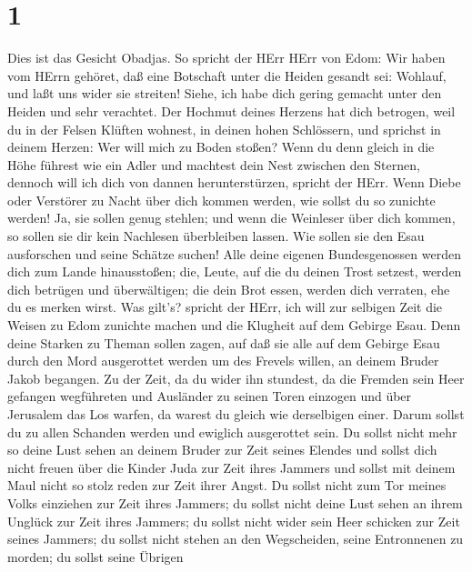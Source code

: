 \hypertarget{section}{%
\section{1}\label{section}}

 Dies ist das Gesicht Obadjas. So spricht der HErr HErr von
Edom: Wir haben vom HErrn gehöret, daß eine Botschaft unter die Heiden
gesandt sei: Wohlauf, und laßt uns wider sie streiten! 
Siehe, ich habe dich gering gemacht unter den Heiden und sehr verachtet.
 Der Hochmut deines Herzens hat dich betrogen, weil du in
der Felsen Klüften wohnest, in deinen hohen Schlössern, und sprichst in
deinem Herzen: Wer will mich zu Boden stoßen?  Wenn du denn
gleich in die Höhe führest wie ein Adler und machtest dein Nest zwischen
den Sternen, dennoch will ich dich von dannen herunterstürzen, spricht
der HErr.  Wenn Diebe oder Verstörer zu Nacht über dich
kommen werden, wie sollst du so zunichte werden! Ja, sie sollen genug
stehlen; und wenn die Weinleser über dich kommen, so sollen sie dir kein
Nachlesen überbleiben lassen.  Wie sollen sie den Esau
ausforschen und seine Schätze suchen!  Alle deine eigenen
Bundesgenossen werden dich zum Lande hinausstoßen; die, Leute, auf die
du deinen Trost setzest, werden dich betrügen und überwältigen; die dein
Brot essen, werden dich verraten, ehe du es merken wirst. 
Was gilt's? spricht der HErr, ich will zur selbigen Zeit die Weisen zu
Edom zunichte machen und die Klugheit auf dem Gebirge Esau. 
Denn deine Starken zu Theman sollen zagen, auf daß sie alle auf dem
Gebirge Esau durch den Mord ausgerottet werden  um des
Frevels willen, an deinem Bruder Jakob begangen.  Zu der
Zeit, da du wider ihn stundest, da die Fremden sein Heer gefangen
wegführeten und Ausländer zu seinen Toren einzogen und über Jerusalem
das Los warfen, da warest du gleich wie derselbigen einer. Darum sollst
du zu allen Schanden werden und ewiglich ausgerottet sein. 
Du sollst nicht mehr so deine Lust sehen an deinem Bruder zur Zeit
seines Elendes und sollst dich nicht freuen über die Kinder Juda zur
Zeit ihres Jammers und sollst mit deinem Maul nicht so stolz reden zur
Zeit ihrer Angst.  Du sollst nicht zum Tor meines Volks
einziehen zur Zeit ihres Jammers; du sollst nicht deine Lust sehen an
ihrem Unglück zur Zeit ihres Jammers; du sollst nicht wider sein Heer
schicken zur Zeit seines Jammers;  du sollst nicht stehen
an den Wegscheiden, seine Entronnenen zu morden; du sollst seine Übrigen
